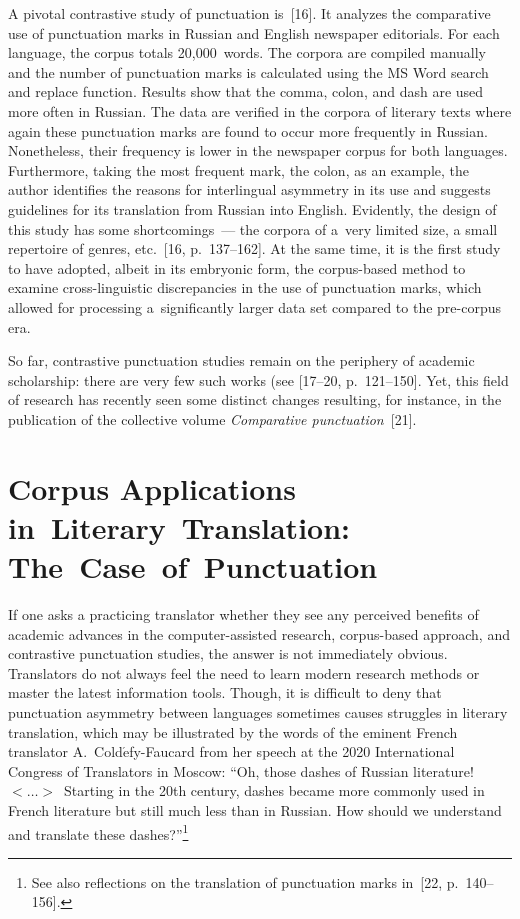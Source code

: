 \begin{multicols}{2}
    A pivotal contrastive study of punctuation is~[16]. It analyzes the 
comparative use of punctuation marks in Russian and English newspaper 
editorials. For each language, the corpus totals 20,000~words. The corpora are 
compiled manually and the number of punctuation marks is calculated using the 
MS Word search and replace function. Results show that the comma, colon, and 
dash are used more often in Russian. The data are verified in the corpora of literary 
texts where again these punctuation marks are found to occur more frequently in 
Russian. Nonetheless, their frequency is lower in the newspaper corpus for both 
languages. Furthermore, taking the most frequent mark, the colon, as an example, 
the author identifies the reasons for interlingual asymmetry in its use and suggests 
guidelines for its translation from Russian into English. Evidently, the design of 
this study has some shortcomings~--- the corpora of a~very limited size, a small 
repertoire of genres, etc.~[16, p.~137--162]. At the same time, it is the first study 
to have adopted, albeit in its embryonic form, the corpus-based method to examine 
cross-linguistic discrepancies in the use of punctuation marks, which allowed for 
processing a~significantly larger data set compared to the pre-corpus era.
    
     So far, contrastive punctuation studies remain on the periphery of academic 
scholarship: there are very few such works (see [17--20, p.~121--150]. Yet, this 
field of research has recently seen some distinct changes resulting, for instance, in 
the publication of the collective volume \textit{Comparative punctuation}~[21].
     
    \section{Corpus Applications in~Literary~Translation: The~Case~of~Punctuation}
    
    \noindent
    If one asks a practicing translator whether they see any perceived benefits of 
academic advances in the computer-assisted research, corpus-based approach, and 
contrastive punctuation studies, the answer is not immediately obvious. Translators 
do not always feel the need to learn modern research methods or master the latest 
information tools. Though, it is difficult to deny that punctuation asymmetry 
between languages sometimes causes struggles in literary translation, which may 
be illustrated by the words of the eminent French translator 
A.~Cold$\acute{\mbox{e}}$fy-Faucard from her speech at the 2020 International 
Congress of Translators in Moscow: ``Oh, those dashes of Russian literature! 
$<\ldots>$~Starting in the 20th century, dashes became more commonly used in 
French literature but still much less than in Russian. How should we understand 
and translate these dashes?''\footnote[1]{See also reflections on the translation of 
punctuation marks in~[22, p.~140--156].}
    

\end{multicols}
